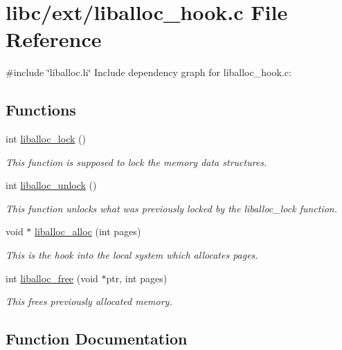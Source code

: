 \hypertarget{a00029}{}\section{libc/ext/liballoc\+\_\+hook.c File Reference}
\label{a00029}
{\ttfamily \#include \char`\"{}liballoc.\+h\char`\"{}}\newline
Include dependency graph for liballoc\+\_\+hook.\+c\+:
\subsection*{Functions}
\begin{DoxyCompactItemize}
\item 
int \hyperlink{a00029_a8b5670e4594b0b6f8be78fe17f0c3b53_a8b5670e4594b0b6f8be78fe17f0c3b53}{liballoc\+\_\+lock} ()
\begin{DoxyCompactList}\small\item\em This function is supposed to lock the memory data structures. \end{DoxyCompactList}\item 
int \hyperlink{a00029_aedc23f198b2882d41d0caa316453967b_aedc23f198b2882d41d0caa316453967b}{liballoc\+\_\+unlock} ()
\begin{DoxyCompactList}\small\item\em This function unlocks what was previously locked by the liballoc\+\_\+lock function. \end{DoxyCompactList}\item 
void $\ast$ \hyperlink{a00029_a857110476fa9dd6317f60a76793a3274_a857110476fa9dd6317f60a76793a3274}{liballoc\+\_\+alloc} (int pages)
\begin{DoxyCompactList}\small\item\em This is the hook into the local system which allocates pages. \end{DoxyCompactList}\item 
int \hyperlink{a00029_aee2dc12f19409f4a76b2aa36f5ab1316_aee2dc12f19409f4a76b2aa36f5ab1316}{liballoc\+\_\+free} (void $\ast$ptr, int pages)
\begin{DoxyCompactList}\small\item\em This frees previously allocated memory. \end{DoxyCompactList}\end{DoxyCompactItemize}


\subsection{Function Documentation}
\mbox{\label{a00029_a857110476fa9dd6317f60a76793a3274_a857110476fa9dd6317f60a76793a3274}} 
